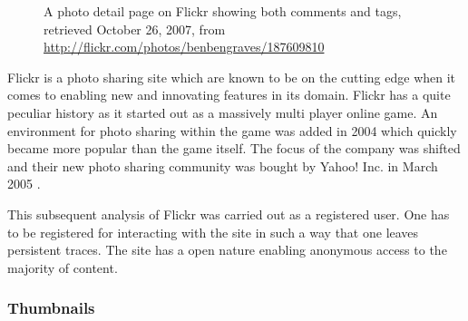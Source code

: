\begin{figure}
\begin{whole}
\begin{minipage}[t]{0.475\wholewidth}
      \caption[Flickr Photo Detail Page]{%
         A photo detail page on Flickr showing both comments and tags,
         retrieved October 26, 2007, from
         \url{http://flickr.com/photos/benbengraves/187609810}}
      \label{figure:scrsh.flickr.photo.detail}
    \end{minipage}
  \end{whole}
  \normalcaption
\end{figure}

Flickr is a photo sharing site which are known to be on the cutting edge when
it comes to enabling new and innovating features in its domain. Flickr has a
quite peculiar history as it started out as a massively multi player online
game. An environment for photo sharing within the game was added in 2004 which
quickly became more popular than the game itself. The focus of the company was
shifted and their new photo sharing community was bought by Yahoo! Inc. in
March 2005 \citep[]{livingston07}.

This subsequent
analysis of Flickr was carried out as a registered user. One has to be
registered for interacting with the site in such a way that one leaves
persistent traces. The site has a open nature enabling anonymous access
to the majority of content.

\subsubsection{Thumbnails}

\newcommand{\placeflickrmetadata}{%
  \sidefigure[Flickr Photo Meta-data]{%
    Photo meta-data on Flickr,
    retrieved October 28, 2007, from
    \url{http://flickr.com/photos/benbengraves/187609810/}
    \label{figure:scrsh.flickr.photo.detail.metadata}
  }{%
    \texttt{[image: scrsh\_flickr\_photo\_metadata]}
  }
}

